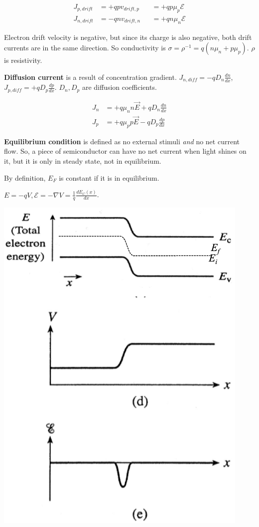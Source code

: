 \documentclass[a4paper,10pt]{article}
\begin{document}
\begin{multicols}{3}
\begin{align*}
    J_{p,drift} &= +qpv_{drift,p} &&= +qp\mu_{p}\mathcal{E}\\
    J_{n,drift} &= -qnv_{drift,n} &&= +qn\mu_{n}\mathcal{E}
\end{align*}

Electron drift velocity is negative, but since its charge is also negative, both drift currents are in the same direction. So conductivity is $\sigma = \rho^{-1} = q(n\mu_{n}+p\mu_{p})$. $\rho$ is resistivity.

\textbf{Diffusion current} is a result of concentration gradient. $J_{n,diff} = -qD_{n}\frac{dn}{dx}$, $J_{p,diff} = +qD_{p}\frac{dp}{dx}$. $D_n, D_p$ are diffusion coefficients.

\begin{align*}
    J_{n}&=  + q\mu_{n}n\vec{E} + qD_{n} \frac{dn}{dx}\\
    J_{p}&=  + q\mu_{p}p\vec{E} - qD_{p} \frac{dp}{dx}
\end{align*}

\textbf{Equilibrium condition} is defined as no external stimuli \textit{and} no net current flow. So, a piece of semiconductor can have no net current when light shines on it, but it is only in steady state, not in equilibrium.

By definition, $E_F$ is constant if it is in equilibrium. 

$E = -qV, \mathcal{E} = -\nabla V = \frac{1}{q} \frac{dE_{C}(x)}{dx}$.

\begin{center}
    \includegraphics[width=0.5\columnwidth]{../img/Pasted image 20241022104107.png}
\end{center}


\end{multicols}
\end{document}
